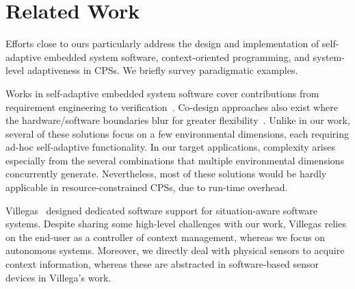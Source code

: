 \section{Related Work}
\label{sec:related}

Efforts close to ours particularly address the design and
implementation of self-adaptive embedded system software,
context-oriented programming, and system-level adaptiveness in
CPSs. We briefly survey paradigmatic examples.

Works in self-adaptive embedded system software
cover contributions from requirement engineering to
verification~\cite{cheng:adaptive}. Co-design approaches also exist
where the hardware/software boundaries blur for greater
flexibility~\cite{diguet11:closed}. Unlike in our work, several of
these solutions focus on a few environmental dimensions, each
requiring ad-hoc self-adaptive functionality. In our target
applications, complexity arises especially from the several
combinations that multiple environmental dimensions concurrently
generate. Nevertheless, most of these solutions would be hardly
applicable in resource-constrained CPSs, due to
run-time overhead.

Villegas~\cite{VilegasPhD11} designed dedicated software support for
situation-aware software systems. Despite sharing some high-level
challenges with our work, Villegas relies on the end-user as a
controller of context management, whereas we focus on autonomous
systems. Moreover, we directly deal with physical sensors to acquire
context information, whereas these are abstracted in software-based
sensor devices in Villega's work.


